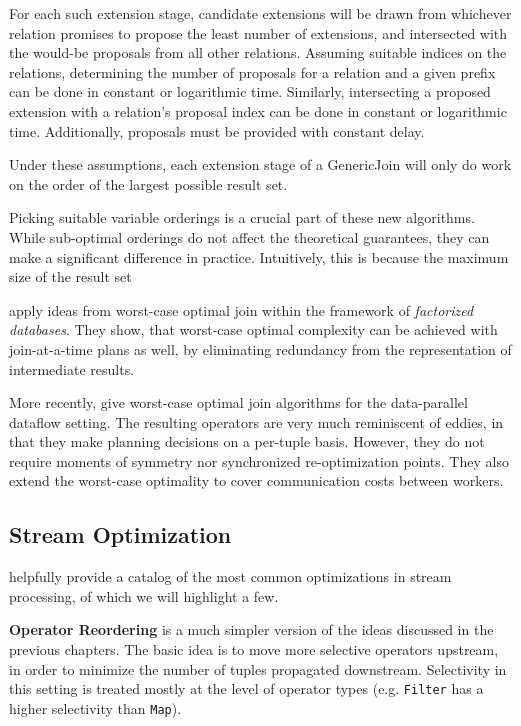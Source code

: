 \documentclass[../index.tex]{subfiles}
\begin{document}
For each such extension stage, candidate extensions will be drawn from
whichever relation promises to propose the least number of extensions,
and intersected with the would-be proposals from all other
relations. Assuming suitable indices on the relations, determining the
number of proposals for a relation and a given prefix can be done in
constant or logarithmic time. Similarly, intersecting a proposed
extension with a relation's proposal index can be done in constant or
logarithmic time. Additionally, proposals must be provided with
constant delay.

Under these assumptions, each extension stage of a GenericJoin will
only do work on the order of the largest possible result set.

Picking suitable variable orderings is a crucial part of these new
algorithms. While sub-optimal orderings do not affect the theoretical
guarantees, they can make a significant difference in
practice. Intuitively, this is because the maximum size of the result set 

\cite{ciucanu2015worst} apply ideas from worst-case optimal join
within the framework of \emph{factorized databases}. They show, that
worst-case optimal complexity can be achieved with join-at-a-time
plans as well, by eliminating redundancy from the representation of
intermediate results.

More recently, \cite{ammar2018distributed} give worst-case optimal
join algorithms for the data-parallel dataflow setting. The resulting
operators are very much reminiscent of eddies, in that they make
planning decisions on a per-tuple basis. However, they do not require
moments of symmetry nor synchronized re-optimization points. They also
extend the worst-case optimality to cover communication costs between
workers.

\subsection{Stream Optimization}

\cite{hirzel2014catalog} helpfully provide a catalog of the most
common optimizations in stream processing, of which we will highlight
a few.

\textbf{Operator Reordering} is a much simpler version of the ideas
discussed in the previous chapters. The basic idea is to move more
selective operators upstream, in order to minimize the number of
tuples propagated downstream. Selectivity in this setting is treated
mostly at the level of operator types (e.g. \texttt{Filter} has a
higher selectivity than \texttt{Map}).
\end{document}

